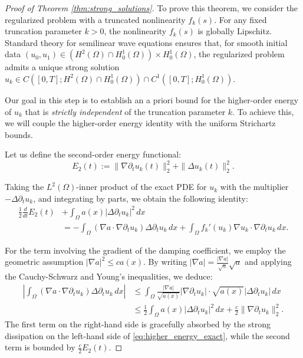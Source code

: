\documentclass[11pt,letterpaper]{amsart}
\begin{document}
\begin{proof}[Proof of Theorem \ref{thm:strong_solutions}]
To prove this theorem, we consider the regularized problem with a truncated nonlinearity $f_k(s)$.
For any fixed truncation parameter $k > 0$, the nonlinearity $f_k(s)$ is globally Lipschitz. Standard theory for semilinear wave equations ensures that, for smooth initial data $(u_0, u_1) \in (H^2(\Omega) \cap H_0^1(\Omega)) \times H_0^1(\Omega)$, the regularized problem admits a unique strong solution $u_k \in C([0,T]; H^2(\Omega) \cap H_0^1(\Omega)) \cap C^1([0,T]; H_0^1(\Omega))$.

Our goal in this step is to establish an a priori bound for the higher-order energy of $u_k$ that is \textit{strictly independent} of the truncation parameter $k$. To achieve this, we will couple the higher-order energy identity with the uniform Strichartz bounds.

Let us define the second-order energy functional:
\begin{equation}
    E_2(t) := \|\nabla \partial_t u_k(t)\|_2^2 + \|\Delta u_k(t)\|_2^2.
\end{equation}

Taking the $L^2(\Omega)$-inner product of the exact PDE for $u_k$ with the multiplier $-\Delta \partial_t u_k$, and integrating by parts, we obtain the following identity:
\begin{align}\label{eq:higher_energy_exact}
    \frac{1}{2}\frac{d}{dt} E_2(t) &+ \int_\Omega a(x)|\Delta \partial_t u_k|^2 \,dx \nonumber \\
    &= - \int_\Omega (\nabla a \cdot \nabla \partial_t u_k)\Delta \partial_t u_k \,dx + \int_\Omega f_k'(u_k)\nabla u_k \cdot \nabla \partial_t u_k \,dx.
\end{align}

For the term involving the gradient of the damping coefficient, we employ the geometric assumption $|\nabla a|^2 \le c a(x)$. By writing $|\nabla a| = \frac{|\nabla a|}{\sqrt{a}} \sqrt{a}$ and applying the Cauchy-Schwarz and Young's inequalities, we deduce:
\begin{align}\label{eq:grad_a_bound_exact}
    \left| \int_\Omega (\nabla a \cdot \nabla \partial_t u_k)\Delta \partial_t u_k \,dx \right| &\le \int_\Omega \frac{|\nabla a|}{\sqrt{a(x)}} |\nabla \partial_t u_k| \cdot \sqrt{a(x)} |\Delta \partial_t u_k| \,dx \nonumber \\
    &\le \frac{1}{2} \int_\Omega a(x)|\Delta \partial_t u_k|^2 \,dx + \frac{c}{2} \|\nabla \partial_t u_k\|_2^2.
\end{align}
The first term on the right-hand side is gracefully absorbed by the strong dissipation on the left-hand side of \eqref{eq:higher_energy_exact}, while the second term is bounded by $\frac{c}{2} E_2(t)$.


\end{proof}
\end{document}
